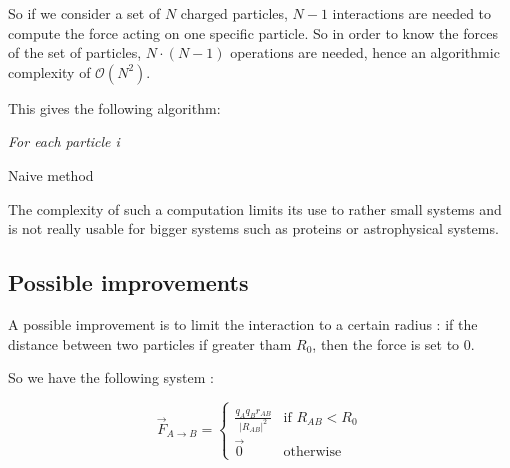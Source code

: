 \documentclass[12pt,twoside,a4paper]{report}
\begin{document}
So if we consider a set of $N$ charged particles, $N-1$ interactions are needed to compute the force acting on one specific particle. So in order to know the forces of the set of particles, $N\cdot(N-1)$ operations are needed, hence an algorithmic complexity of $\mathcal{O}(N^2)$.

This gives the following algorithm:



\IncMargin{1em}
\begin{algorithm}[H]



\BlankLine

\emph{For each particle i}\;
\caption{Naive method}\label{algo_disjdecomp}
\end{algorithm}\DecMargin{1em}


The complexity of such a computation limits its use to rather small systems and is not really usable for bigger systems such as proteins or astrophysical systems.


\subsection{Possible improvements}

A possible improvement is to limit the interaction to a certain radius : if the distance between two particles if greater tham $R_0$, then the force is set to $0$.

So we have the following system :


\begin{equation}
  \overrightarrow{F}_{A \rightarrow B}  =
	\begin{cases}
	  \frac{q_A q_B \hat{r}_{AB} }{|R_{AB}|^2}  & \text{if } R_{AB} < R_0 \\
	  \overrightarrow{0} & \text{otherwise}
	\end{cases}
\end{equation}
\end{document}
